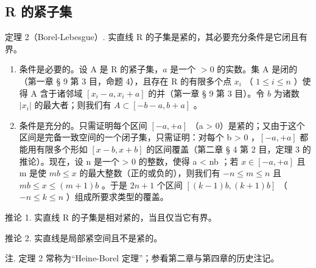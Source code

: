 \subsection{R 的紧子集}

定理 2（Borel-Lebesgue）. 实直线 R 的子集是紧的，其必要充分条件是它闭且有界。

\begin{enumerate}
\def\labelenumi{\arabic{enumi})}
\item
  条件是必要的。设 A 是 R 的紧子集，\(a\) 是一个 \(>0\) 的实数。集 A 是闭的（第一章 § 9 第 3 目，命题 4），且存在 R 的有限多个点 \(x_{i}\) （ \(1 \leqslant i \leqslant n\) ）使得 A 含于诸邻域 \([x_{i} - a, x_{i} + a]\) 的并（第一章 § 9 第 3 目）。令 \(b\) 为诸数 \(|x_{i}|\) 的最大者；则我们有 \(A \subset [-b - a, b + a]\) 。
\item
  条件是充分的。只需证明每个区间 \([-a, +a]\) （a \textgreater{} 0）是紧的；又由于这个区间是完备一致空间的一个闭子集，只需证明：对每个 b \textgreater{} 0 ，\([-a, +a]\) 都能用有限多个形如 \([x - b, x + b]\) 的区间覆盖（第二章 § 4 第 2 目，定理 3 的推论）。现在，设 n 是一个 \textgreater{} 0 的整数，使得 a \textless{} nb ；若 \(x \in [-a, +a]\) 且 m 是使 \(mb \leqslant x\) 的最大整数（正的或负的），则我们有 \(-n \leqslant m \leqslant n\) 且 \(mb \leqslant x \leqslant (m + 1)b\) 。于是 \(2n + 1\) 个区间 \([(k - 1)b, (k + 1)b]\) （ \(-n \leqslant k \leqslant n\) ）组成所要求类型的覆盖。
\end{enumerate}

推论 1. 实直线 R 的子集是相对紧的，当且仅当它有界。

推论 2. 实直线是局部紧空间且不是紧的。

注. 定理 2 常称为“Heine-Borel 定理”；参看第二章与第四章的历史注记。

